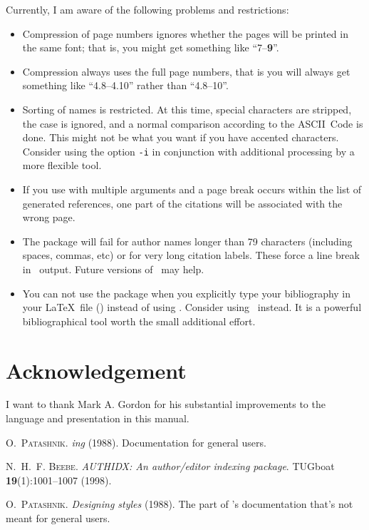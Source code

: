 \documentclass[a4paper]{article}
\newcommand{\cmdline}[1]{\texttt{#1}}
\newcommand{\option}[1]{\cmdline{#1}}
\newcommand{\ltxinp}[1]{\texttt{\string#1}}
\begin{document}
Currently, I am aware of the following problems and restrictions:
\begin{itemize}
\item Compression of page numbers ignores whether the pages will be printed in
  the same font; that is, you might get something like ``7--\textbf{9}''.
\item Compression always uses the full page numbers, that is you will always
  get something like ``4.8--4.10'' rather than ``4.8--10''.
\item Sorting of names is restricted.  At this time, special characters are
  stripped, the case is ignored, and a normal comparison according to the
  ASCII~Code is done.  This might not be what you want if you have accented
  characters.  Consider using the option \option{-i} in conjunction with
  additional processing by a more flexible tool.
\item If you use \ltxinp{\aicite} with multiple arguments and a page break
  occurs within the list of generated references, one part of the citations
  will be associated with the wrong page.
\item The package will fail for author names longer than 79 characters
  (including spaces, commas, etc) or for very long citation labels. These force
  a line break in \BibTeX\ output.  Future versions of \BibTeX\ may help.
\item You can not use the package when you explicitly type your bibliography in
  your \LaTeX\ file (\ltxinp{\bibitem}) instead of using \BibTeX. Consider
  using \BibTeX\ instead.  It is a powerful bibliographical tool worth the
  small additional effort.
\end{itemize}

\section{Acknowledgement}

I want to thank Mark A. Gordon for his substantial improvements to the language
and presentation in this manual.


\begin{thebibliography}{3}

\textsc{O.~Patashnik}.
\newblock \textsl{{\BibTeX ing}} (1988).
\newblock Documentation for general {\BibTeX} users.

\textsc{N.~H.~F. Beebe}.
\newblock \textsl{{AUTHIDX}: An author/editor indexing package}.
\newblock TUGboat \textbf{19}(1):1001--1007 (1998).

\textsc{O.~Patashnik}.
\newblock \textsl{Designing {\BibTeX} styles} (1988).
\newblock The part of \BibTeX's documentation that's not meant for general
  users.

\end{thebibliography}
\end{document}
